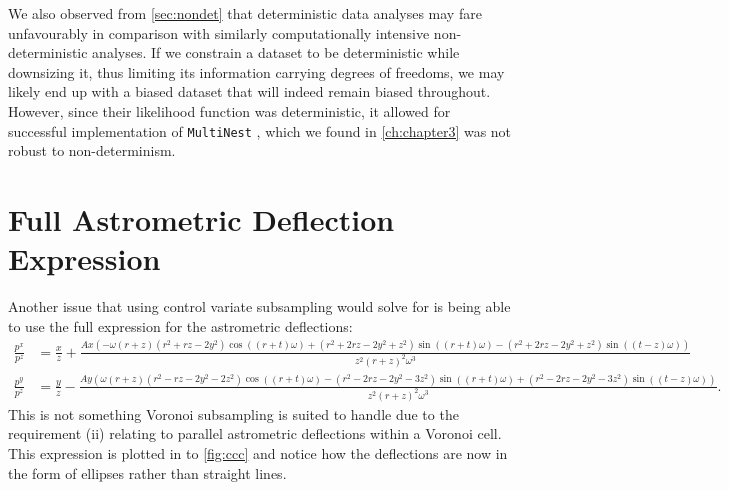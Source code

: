 We also observed from \cref{sec:nondet} that deterministic data analyses may fare unfavourably in comparison with similarly computationally intensive non-deterministic analyses. If we constrain a dataset to be deterministic while downsizing it, thus limiting its information carrying degrees of freedoms, we may likely end up with a biased dataset that will indeed remain biased throughout. However, since their likelihood function was deterministic, it allowed for successful implementation of \texttt{MultiNest} \cite{Feroz_2009}, which we found in \cref{ch:chapter3} was not robust to non-determinism.

\section{Full Astrometric Deflection Expression}

Another issue that using control variate subsampling would solve for is being able to use the full expression for the astrometric deflections:
%
\begin{equation}
    \begin{aligned}
        \textstyle \frac{p^x}{p^z} &= \textstyle \frac{x}{z} + \frac{A x\left(-\omega  \left(r +z \right) \left(r^2+r z -2 y^2\right) \cos \left(\left(r + t \right) \omega \right)+\left(r^2+2 r z -2 y^2+z^2\right) \sin \left(\left(r + t \right) \omega \right)-\left(r^2+2 r z -2 y^2+z^2\right) \sin \left((t-z)\omega \right)\right)}{z^2 \left(r +z \right)^2 \omega^3} \\
        \textstyle \frac{p^y}{p^z} &= \textstyle \frac{y}{z}-\frac{Ay\left(\omega  \left(r +z \right) \left(r^2-r z -2 y^2-2 z^2\right) \cos \left( \left(r + t \right) \omega \right)-\left(r^2-2 r z -2 y^2-3 z^2\right) \sin \left(\left(r + t \right) \omega \right)+\left(r^2-2 r z -2 y^2-3 z^2\right) \sin \left((t-z)  \omega \right)\right)}{z^2 \left(r +z \right)^2 \omega^3}.
    \end{aligned}
\label{eq:nff}
\end{equation}
%
This is not something Voronoi subsampling is suited to handle due to the requirement (ii) relating to parallel astrometric deflections within a Voronoi cell. This expression is plotted in to \cref{fig:ccc} and notice how the deflections are now in the form of ellipses rather than straight lines. 


